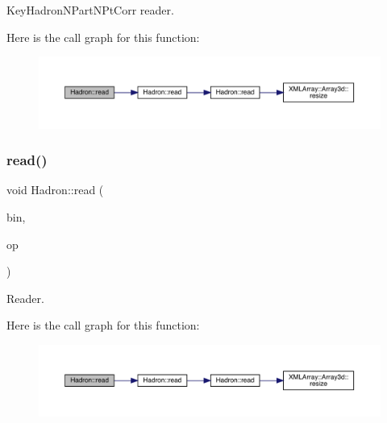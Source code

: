 Key\+Hadron\+N\+Part\+N\+Pt\+Corr reader. 

Here is the call graph for this function\+:
\nopagebreak
\begin{figure}[H]
\begin{center}
\leavevmode
\includegraphics[width=350pt]{d1/daf/namespaceHadron_a9478eee791b9cb2c8523893a334602e2_cgraph}
\end{center}
\end{figure}
\mbox{\label{namespaceHadron_a02133bc62e51d4baa57fb5ba0742ff43}} 
\subsubsection{\texorpdfstring{read()}{read()}\hspace{0.1cm}{\footnotesize\ttfamily [52/94]}}
{\footnotesize\ttfamily void Hadron\+::read (\begin{DoxyParamCaption}\item[{\mbox{\hyperlink{classADATIO_1_1BinaryReader}{Binary\+Reader}} \&}]{bin,  }\item[{\mbox{\hyperlink{structHadron_1_1KeySingleHadronQuarkSpin__t}{Key\+Single\+Hadron\+Quark\+Spin\+\_\+t}} \&}]{op }\end{DoxyParamCaption})}



Reader. 

Here is the call graph for this function\+:
\nopagebreak
\begin{figure}[H]
\begin{center}
\leavevmode
\includegraphics[width=350pt]{d1/daf/namespaceHadron_a02133bc62e51d4baa57fb5ba0742ff43_cgraph}
\end{center}
\end{figure}
\mbox{\label{namespaceHadron_a475e00d642e0578e7bbe956bbbf37aac}} 
